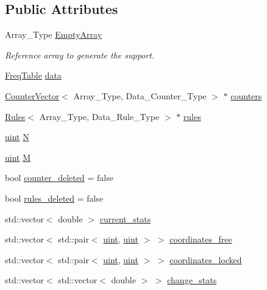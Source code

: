 \subsection*{Public Attributes}
\begin{DoxyCompactItemize}
\item 
Array\+\_\+\+Type \hyperlink{classbarry_1_1_support_a2eec6569a9206965a679782f7acf12e5}{Empty\+Array}
\begin{DoxyCompactList}\small\item\em Reference array to generate the support. \end{DoxyCompactList}\item 
\hyperlink{classbarry_1_1_freq_table}{Freq\+Table} \hyperlink{classbarry_1_1_support_ab58b9801dcbb924d68fd18db0821de99}{data}
\item 
\hyperlink{classbarry_1_1_counter_vector}{Counter\+Vector}$<$ Array\+\_\+\+Type, Data\+\_\+\+Counter\+\_\+\+Type $>$ $\ast$ \hyperlink{classbarry_1_1_support_ab1d697b1f970b160db6d5f76d602bb3c}{counters}
\item 
\hyperlink{classbarry_1_1_rules}{Rules}$<$ Array\+\_\+\+Type, Data\+\_\+\+Rule\+\_\+\+Type $>$ $\ast$ \hyperlink{classbarry_1_1_support_a9311c3288f59feaece0680f9a7b630dd}{rules}
\item 
\hyperlink{namespacebarry_a11dfc53ddb4672278319aa04f1e09a6c}{uint} \hyperlink{classbarry_1_1_support_a776221deb92d113e5dee1cb100174ed4}{N}
\item 
\hyperlink{namespacebarry_a11dfc53ddb4672278319aa04f1e09a6c}{uint} \hyperlink{classbarry_1_1_support_abdf54592050a1c0db0fc7b079a7f9703}{M}
\item 
bool \hyperlink{classbarry_1_1_support_a5de08029a7262ba86df728c8b8427999}{counter\+\_\+deleted} = false
\item 
bool \hyperlink{classbarry_1_1_support_ab06f3a207f1d647d327a815bcedba9dd}{rules\+\_\+deleted} = false
\item 
std\+::vector$<$ double $>$ \hyperlink{classbarry_1_1_support_aa69d5a47e5ee039b19f42edacd5453d4}{current\+\_\+stats}
\item 
std\+::vector$<$ std\+::pair$<$ \hyperlink{namespacebarry_a11dfc53ddb4672278319aa04f1e09a6c}{uint}, \hyperlink{namespacebarry_a11dfc53ddb4672278319aa04f1e09a6c}{uint} $>$ $>$ \hyperlink{classbarry_1_1_support_aa235837435a5ed7ac540481676333b88}{coordinates\+\_\+free}
\item 
std\+::vector$<$ std\+::pair$<$ \hyperlink{namespacebarry_a11dfc53ddb4672278319aa04f1e09a6c}{uint}, \hyperlink{namespacebarry_a11dfc53ddb4672278319aa04f1e09a6c}{uint} $>$ $>$ \hyperlink{classbarry_1_1_support_a3abcd564b19c7399b596a5b63c72b149}{coordinates\+\_\+locked}
\item 
std\+::vector$<$ std\+::vector$<$ double $>$ $>$ \hyperlink{classbarry_1_1_support_a37c139514065d10807cd574ca748744b}{change\+\_\+stats}
\end{DoxyCompactItemize}


